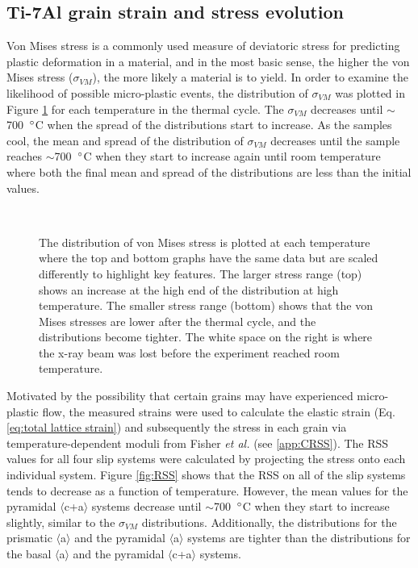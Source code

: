 \documentclass[3p]{elsarticle}
\begin{document}
\subsection{Ti-7Al grain strain and stress evolution}	
	Von Mises stress is a commonly used measure of deviatoric stress for predicting plastic deformation in a material, and in the most basic sense, the higher the von Mises stress ($\sigma_{VM}$), the more likely a material is to yield. In order to examine the likelihood of possible micro-plastic events, the distribution of $\sigma_{VM}$ was plotted in Figure \ref{fig:full_thermal_cycle} for each temperature in the thermal cycle. The $\sigma_{VM}$ decreases until $\sim$700~$\degree$C when the spread of the distributions start to increase. As the samples cool, the mean and spread of the distribution of $\sigma_{VM}$ decreases until the sample reaches $\sim$700~$\degree$C when they start to increase again until room temperature where both the final mean and spread of the distributions are less than the initial values.


	\begin{figure}[h]
		\centering
		\hspace{5pt}
		 \\

		\caption{The distribution of von Mises stress is plotted at each temperature where the top and bottom graphs have the same data but are scaled dif{}ferently to highlight key features. The larger stress range (top) shows an increase at the high end of the distribution at high temperature. The smaller stress range (bottom) shows that the von Mises stresses are lower after the thermal cycle, and the distributions become tighter. The white space on the right is where the x-ray beam was lost before the experiment reached room temperature.} \label{fig:full_thermal_cycle}		
	\end{figure}


	
	Motivated by the possibility that certain grains may have experienced micro-plastic flow, the measured strains were used to calculate the elastic strain (Eq. \ref{eq:total lattice strain}) and subsequently the stress in each grain via temperature-dependent moduli from Fisher \textit{et al.} \cite{Fisher1964} (see \ref{app:CRSS}). The RSS values for all four slip systems were calculated by projecting the stress onto each individual system. Figure \ref{fig:RSS} shows that the RSS on all of the slip systems tends to decrease as a function of temperature. However, the mean values for the pyramidal $\langle$c+a$\rangle$ systems decrease until $\sim$700~$\degree$C when they start to increase slightly, similar to the $\sigma_{VM}$ distributions. Additionally, the distributions for the prismatic $\langle$a$\rangle$ and the pyramidal $\langle$a$\rangle$ systems are tighter than the distributions for the basal $\langle$a$\rangle$ and the pyramidal $\langle$c+a$\rangle$ systems.
	
\end{document}
